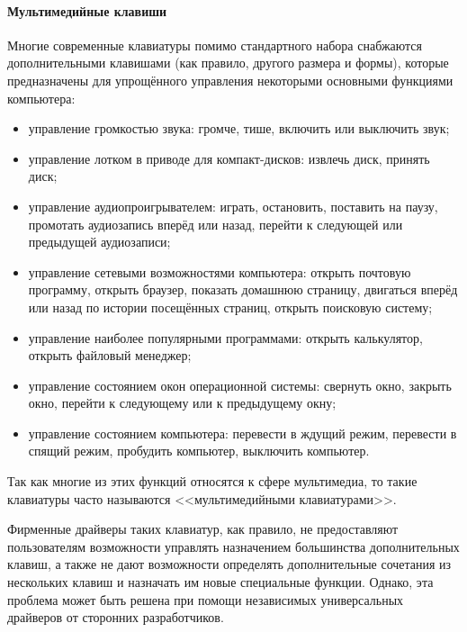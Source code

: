 \paragraph{Мультимедийные клавиши}
Многие современные клавиатуры помимо стандартного набора снабжаются дополнительными клавишами (как правило, другого размера и формы), которые предназначены для упрощённого управления некоторыми основными функциями компьютера:
\begin{itemize}
 \item управление громкостью звука: громче, тише, включить или выключить звук;
 \item управление лотком в приводе для компакт-дисков: извлечь диск, принять диск;
 \item управление аудиопроигрывателем: играть, остановить, поставить на паузу, промотать аудиозапись вперёд или назад, перейти к следующей или предыдущей аудиозаписи;
 \item управление сетевыми возможностями компьютера: открыть почтовую программу, открыть браузер, показать домашнюю страницу, двигаться вперёд или назад по истории посещённых страниц, открыть поисковую систему;
 \item управление наиболее популярными программами: открыть калькулятор, открыть файловый менеджер;
 \item управление состоянием окон операционной системы: свернуть окно, закрыть окно, перейти к следующему или к предыдущему окну;
 \item управление состоянием компьютера: перевести в ждущий режим, перевести в спящий режим, пробудить компьютер, выключить компьютер.
\end{itemize}

Так как многие из этих функций относятся к сфере мультимедиа, то такие клавиатуры часто называются <<мультимедийными клавиатурами>>.

Фирменные драйверы таких клавиатур, как правило, не предоставляют пользователям возможности управлять назначением большинства дополнительных клавиш, а также не дают возможности определять дополнительные сочетания из нескольких клавиш и назначать им новые специальные функции.
Однако, эта проблема может быть решена при помощи независимых универсальных драйверов от сторонних разработчиков.

